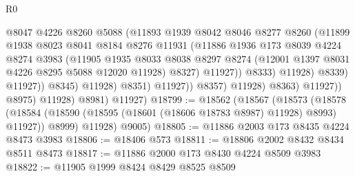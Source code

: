 \begin{lexlean}{R0}
\begin{coremodule}
                                        @8047
                                        @4226
                                        @8260
                                        @5088
                                        (@11893
                                          @1939
                                          @8042
                                          @8046
                                          @8277
                                          @8260
                                          (@11899
                                            @1938
                                            @8023
                                            @8041
                                            @8184
                                            @8276
                                            @11931
                                            (@11886
                                              @1936
                                              @173
                                              @8039
                                              @4224
                                              @8274
                                              @3983
                                              (@11905
                                                @1935
                                                @8033
                                                @8038
                                                @8297
                                                @8274
                                                (@12001 @1397 @8031 @4226 @8295 @5088 @12020 @11928)
                                                @8327)
                                              @11927))
                                          @8333)
                                        @11928)
                                      @8339)
                                    @11927))
                                @8345)
                              @11928)
                            @8351)
                          @11927))
                      @8357)
                    @11928)
                  @8363)
                @11927))
            @8975)
          @11928)
        @8981)
      @11927)
@18799 := @18562
    (@18567
      (@18573
        (@18578 (@18584 (@18590 (@18595 (@18601 (@18606 @18783 @8987) @11928) @8993) @11927)) @8999)
        @11928)
      @9005)
@18805 := @11886 @2003 @173 @8435 @4224 @8473 @3983
@18806 := @18406 @573
@18811 := @18806 @2002 @8432 @8434 @8511 @8473
@18817 := @11886 @2000 @173 @8430 @4224 @8509 @3983
@18822 := @11905 @1999 @8424 @8429 @8525 @8509

\end{coremodule}
\end{lexlean}
